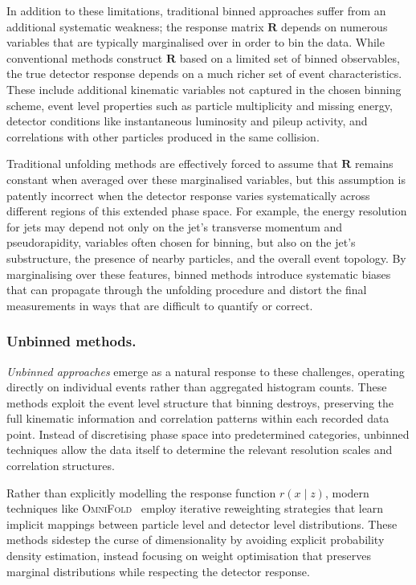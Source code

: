             In addition to these limitations, traditional binned approaches suffer from an additional systematic weakness;
            the response matrix \(\mathbf{R}\) depends on numerous variables that are typically marginalised over in order to bin the data.
            While conventional methods construct \(\mathbf{R}\) based on a limited set of binned observables, the true detector response depends on a much richer set of event characteristics.
            These include additional kinematic variables not captured in the chosen binning scheme, event level properties such as particle multiplicity and missing energy, detector conditions like instantaneous luminosity and pileup activity, and correlations with other particles produced in the same collision.
            
            Traditional unfolding methods are effectively forced to assume that \(\mathbf{R}\) remains constant when averaged over these marginalised variables, but this assumption is patently incorrect when the detector response varies systematically across different regions of this extended phase space.
            For example, the energy resolution for jets may depend not only on the jet's transverse momentum and pseudorapidity, variables often chosen for binning, but also on the jet's substructure, the presence of nearby particles, and the overall event topology.
            By marginalising over these features, binned methods introduce systematic biases that can propagate through the unfolding procedure and distort the final measurements in ways that are difficult to quantify or correct.

        \subsubsection{Unbinned methods.}
        \emph{Unbinned approaches} emerge as a natural response to these challenges, operating directly on individual events rather than aggregated histogram counts.
        These methods exploit the event level structure that binning destroys, preserving the full kinematic information and correlation patterns within each recorded data point.
        Instead of discretising phase space into predetermined categories, unbinned techniques allow the data itself to determine the relevant resolution scales and correlation structures.
        
        Rather than explicitly modelling the response function \(r(x\mid z)\), modern techniques like \textsc{OmniFold}~\cite{andreassen_omnifold_2020} employ iterative reweighting strategies that learn implicit mappings between particle level and detector level distributions.
        These methods sidestep the curse of dimensionality by avoiding explicit probability density estimation, instead focusing on weight optimisation that preserves marginal distributions while respecting the detector response.

